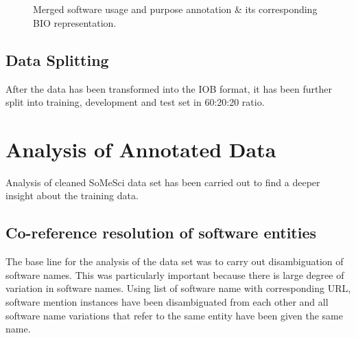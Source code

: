 \begin{figure}[h]
	
	\myfloatalign
	
	 \\
	\\
	\caption[Subfloat - Figure]{Merged software usage and purpose annotation \& its corresponding BIO representation.}
\end{figure}

\subsection{Data Splitting}
\label{subsec:dataset:preprocessing:Splitting}
After the data has been transformed into the IOB format, it has been further split into training, development and test set in 60:20:20 ratio.


\section{Analysis of Annotated Data}
\label{sec:dataset:Analysis}

Analysis of cleaned SoMeSci data set has been carried out to find a deeper insight about the training data. 

\subsection{Co-reference resolution of software entities }
\label{subsec:dataset:Analysis:resolution}

The base line for the analysis of the data set was to carry out disambiguation of software names. This was particularly important because there is large degree of variation in software names. Using list of software name with corresponding URL, software mention instances have been disambiguated from each other and all software name variations that refer to the same entity have been given the same name. \\

